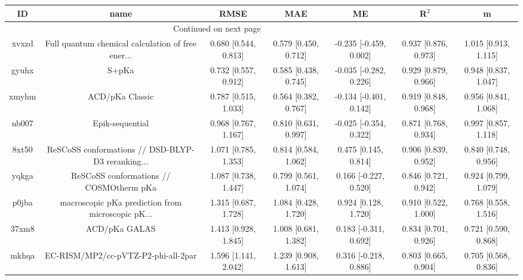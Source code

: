 \documentclass{article}
\begin{document}
\begin{center}
\begin{longtable}{|ccccccc|}
\toprule
    ID &                                               name &                  RMSE &                   MAE &                       ME &                 R$^2$ &                      m \\
\midrule
\endhead
\midrule
\multicolumn{3}{r}{{Continued on next page}} \\
\midrule
\endfoot

\bottomrule
\endlastfoot
 xvxzd &  Full quantum chemical calculation of free ener... &  0.680 [0.544, 0.813] &  0.579 [0.450, 0.712] &   -0.235 [-0.459, 0.002] &  0.937 [0.876, 0.973] &   1.015 [0.913, 1.115] \\
 gyuhx &                                              S+pKa &  0.732 [0.557, 0.912] &  0.585 [0.438, 0.745] &   -0.035 [-0.282, 0.226] &  0.929 [0.879, 0.966] &   0.948 [0.837, 1.047] \\
 xmyhm &                                    ACD/pKa Classic &  0.787 [0.515, 1.033] &  0.564 [0.382, 0.767] &   -0.134 [-0.401, 0.142] &  0.919 [0.848, 0.968] &   0.956 [0.841, 1.068] \\
 nb007 &                                    Epik-sequential &  0.968 [0.767, 1.167] &  0.810 [0.631, 0.997] &   -0.025 [-0.354, 0.322] &  0.871 [0.768, 0.934] &   0.997 [0.857, 1.118] \\
 8xt50 &  ReSCoSS conformations // DSD-BLYP-D3 reranking... &  1.071 [0.785, 1.353] &  0.814 [0.584, 1.062] &     0.475 [0.145, 0.814] &  0.906 [0.839, 0.952] &   0.840 [0.748, 0.956] \\
 yqkga &            ReSCoSS conformations // COSMOtherm pKa &  1.087 [0.738, 1.447] &  0.799 [0.561, 1.074] &    0.166 [-0.227, 0.520] &  0.846 [0.721, 0.942] &   0.924 [0.799, 1.079] \\
 p0jba &  macroscopic pKa prediction from microscopic pK... &  1.315 [0.687, 1.728] &  1.084 [0.428, 1.720] &     0.924 [0.128, 1.720] &  0.910 [0.522, 1.000] &   0.768 [0.558, 1.516] \\
 37xm8 &                                      ACD/pKa GALAS &  1.413 [0.928, 1.845] &  1.008 [0.681, 1.382] &    0.183 [-0.311, 0.692] &  0.834 [0.701, 0.926] &   0.721 [0.590, 0.868] \\
 mkhqa &                EC-RISM/MP2/cc-pVTZ-P2-phi-all-2par &  1.596 [1.141, 2.042] &  1.239 [0.908, 1.613] &    0.316 [-0.218, 0.886] &  0.803 [0.665, 0.904] &   0.705 [0.568, 0.836] \\

\end{longtable}
\end{center}
\end{document}
